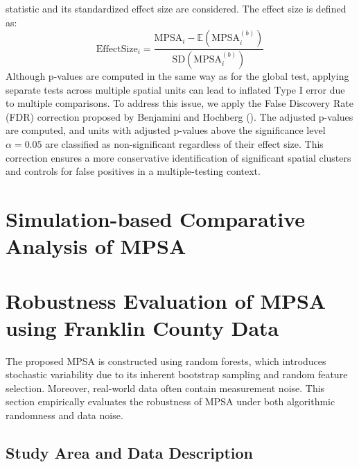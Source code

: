 \documentclass[
  a4paper,
  12pt]{article}
\begin{document}
statistic and its standardized effect size are considered. The effect
size is defined as: \begin{equation}
\text{EffectSize}_i = \frac{\text{MPSA}_i - \mathbb{E}(\text{MPSA}_i^{(b)})}{\text{SD}(\text{MPSA}_i^{(b)})}
\end{equation} Although p-values are computed in the same way as for the
global test, applying separate tests across multiple spatial units can
lead to inflated Type I error due to multiple comparisons. To address
this issue, we apply the False Discovery Rate (FDR) correction proposed
by Benjamini and Hochberg (). The
adjusted p-values are computed, and units with adjusted p-values above
the significance level \(\alpha = 0.05\) are classified as
non-significant regardless of their effect size. This correction ensures
a more conservative identification of significant spatial clusters and
controls for false positives in a multiple-testing context.

\section{Simulation-based Comparative Analysis of
MPSA}\label{simulation-based-comparative-analysis-of-mpsa}

\section{Robustness Evaluation of MPSA using Franklin County
Data}\label{robustness-evaluation-of-mpsa-using-franklin-county-data}

The proposed MPSA is constructed using random forests, which introduces
stochastic variability due to its inherent bootstrap sampling and random
feature selection. Moreover, real-world data often contain measurement
noise. This section empirically evaluates the robustness of MPSA under
both algorithmic randomness and data noise.

\subsection{Study Area and Data
Description}\label{study-area-and-data-description}
\end{document}
